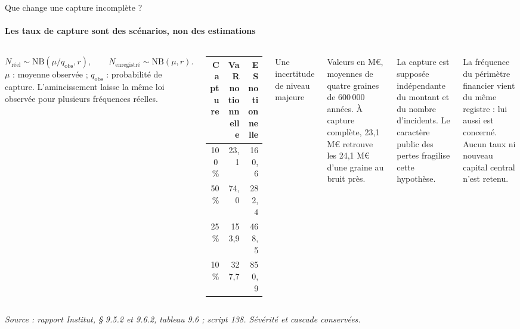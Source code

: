\documentclass[aspectratio=169,10pt,t]{beamer}
\newcommand{\source}[1]{\par\vfill{\tiny\color{gris}\textit{Source : #1}}\par\vspace{-1mm}}
\renewcommand{\arraystretch}{1.25}
\begin{document}
\begin{frame}{Que change une capture incomplète ?}
  \framesubtitle{\ajout Les taux de capture sont des scénarios, non des estimations}
  \begin{columns}[T,onlytextwidth]
    \footnotesize
    \[N_{\mathrm{réel}}\sim\mathrm{NB}(\mu/q_{\mathrm{obs}},r),\qquad
      N_{\mathrm{enregistré}}\sim\mathrm{NB}(\mu,r).\]
    $\mu$ : moyenne observée ; $q_{\mathrm{obs}}$ : probabilité de capture. L'amincissement laisse la même loi observée pour plusieurs fréquences réelles.\par\vspace{1.5mm}
    \renewcommand{\arraystretch}{1.18}
    \begin{tabular}{@{}rrr@{}}
      \toprule
      Capture & VaR notionnelle & ES notionnelle \\
      \midrule
      100\,\% & 23,1 & 160,6 \\
      50\,\% & 74,0 & 282,4 \\
      25\,\% & 153,9 & 468,5 \\
      10\,\% & 327,7 & 850,9 \\
      \bottomrule
    \end{tabular}
    \footnotesize
    {\editorial\normalsize Une incertitude de niveau majeure}\par\vspace{1.5mm}
    Valeurs en M€, moyennes de quatre graines de 600\,000 années. À capture complète, 23,1 M€ retrouve les 24,1 M€ d'une graine au bruit près.\par\vspace{1.5mm}
    La capture est supposée indépendante du montant et du nombre d'incidents. Le caractère public des pertes fragilise cette hypothèse.\par\vspace{1.5mm}
    La fréquence du périmètre financier vient du même registre : lui aussi est concerné. Aucun taux ni nouveau capital central n'est retenu.
  \end{columns}
  \source{rapport Institut, § 9.5.2 et 9.6.2, tableau 9.6 ; script 138. Sévérité et cascade conservées.}
\end{frame}
\end{document}
